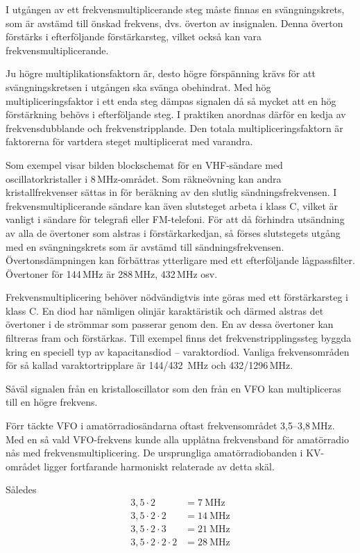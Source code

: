 I utgången av ett frekvensmultiplicerande steg måste finnas en
svängningskrets, som är avstämd till önskad frekvens, dvs. överton
av insignalen.
Denna överton förstärks i efterföljande förstärkarsteg, vilket också kan vara
frekvensmultiplicerande.

Ju högre multiplikationsfaktorn är, desto högre förspänning krävs för
att svängningskretsen i utgången ska svänga obehindrat.
Med hög multipliceringsfaktor i ett enda steg dämpas signalen då så mycket att
en hög förstärkning behövs i efterföljande steg.
I praktiken anordnas därför en kedja av frekvensdubblande och
frekvenstripplande.
Den totala multipliceringsfaktorn är faktorerna för vartdera steget
multiplicerat med varandra.

Som exempel visar bilden blockschemat för en VHF-sändare med
oscillatorkristaller i 8\,MHz-området.
Som räkneövning kan andra kristallfrekvenser sättas in för beräkning av den
slutlig sändningsfrekvensen.
I frekvensmultiplicerande sändare kan även slutsteget arbeta i klass C, vilket
är vanligt i sändare för telegrafi eller FM-telefoni.
För att då förhindra utsändning av alla de övertoner som alstras i
förstärkarkedjan, så förses slutstegets utgång med en svängningskrets som är
avstämd till sändningsfrekvensen.
Övertonsdämpningen kan förbättras ytterligare med ett efterföljande
lågpassfilter.
Övertoner för 144\,MHz är 288\,MHz, 432\,MHz osv.

Frekvensmultiplicering behöver nödvändigtvis inte göras med ett förstärkarsteg
i klass C.
En diod har nämligen olinjär karaktäristik och därmed alstras det övertoner i
de strömmar som passerar genom den.
En av dessa övertoner kan filtreras fram och förstärkas.
Till exempel finns det frekvenstripplingssteg byggda kring en speciell typ av
kapacitansdiod -- varaktordiod.
Vanliga frekvensområden för så kallad varaktortripplare är 144/432~MHz och
432/1296\,MHz.

Såväl signalen från en kristalloscillator som den från en VFO kan
multipliceras till en högre frekvens.

Förr täckte VFO i amatörradiosändarna oftast frekvensområdet 3,5--3,8\,MHz.
Med en så vald VFO-frekvens kunde alla upplåtna frekvensband för
amatörradio nås med frekvensmultiplicering.
De ursprungliga amatörradiobanden i KV-området ligger fortfarande harmoniskt
relaterade av detta skäl.

Således
\begin{align*}
  3,5 \cdot 2 & = 7\ \text{MHz} \\
  3,5 \cdot 2 \cdot 2 & = 14\ \text{MHz} \\
  3,5 \cdot 2 \cdot 3 & = 21\ \text{MHz} \\
  3,5 \cdot 2 \cdot 2 \cdot 2 & = 28\ \text{MHz} \\
\end{align*}

